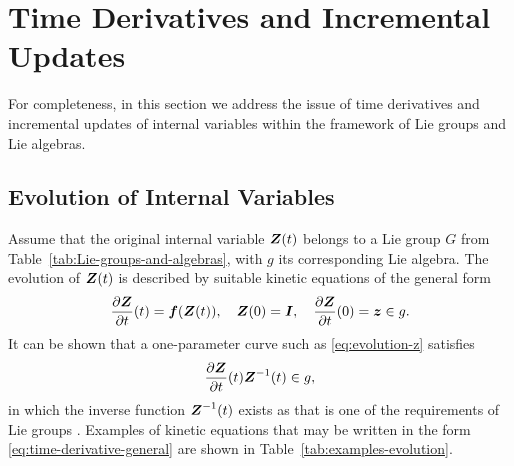 \documentclass[12pt]{article}
\begin{document}
\begin{table}[htbp]
\begin{center}
    \caption{Examples of interpolation and extrapolation with Lie algebras.
      $\bZ_1 = \bZ(-1)$ and $\bZ_2 = \bZ(1)$
      are given data and belong to the corresponding Lie group.
      $\bZ(\xi) := \exp[N_1(\xi)\log\bZ_1 + N_2(\xi)\log\bZ_2]$.
      $N_1(\xi):=\frac{1}{2}(1-\xi)$ and $N_2(\xi):=\frac{1}{2}(1+\xi)$.}
    \label{tab:examples-interpolation-Lie}
  \end{center}
\end{table}

\section{Time Derivatives and Incremental Updates}
\label{sec:derivatives}

For completeness, in this section we address the issue of time
derivatives and incremental updates of internal variables within the
framework of Lie groups and Lie algebras.

\subsection{Evolution of Internal Variables}

Assume that the original
internal variable ${\boldsymbol{Z}}(t)$ belongs to a Lie group $G$ from
Table~\ref{tab:Lie-groups-and-algebras}, with $g$ its corresponding Lie
algebra. The evolution of ${\boldsymbol{Z}}(t)$ is described by suitable kinetic
equations of the general form
\begin{equation} \label{eq:evolution-z}
  \frac{\partial {\boldsymbol{Z}}}{\partial t}(t) = {\boldsymbol{f}}({\boldsymbol{Z}}(t)), \quad
  {\boldsymbol{Z}}(0) = {\boldsymbol{I}}, \quad
  \frac{\partial {\boldsymbol{Z}}}{\partial t}(0) = {\boldsymbol{z}} \in g.
\end{equation}
It can be shown that a one-parameter curve such as
\eqref{eq:evolution-z} satisfies
\begin{equation} \label{eq:time-derivative-general}
  \frac{\partial {\boldsymbol{Z}}}{\partial t}(t) {\boldsymbol{Z}}^{-1}(t) \in g,
\end{equation}
in which the inverse function ${\boldsymbol{Z}}^{-1}(t)$ exists as that is one of
the requirements of Lie groups \citep{Procesi:2006, Sepanski:2007,
  Kosmann-Schwarzbach:2009, Gallier:2011}. Examples of kinetic
equations that may be written in the form
\eqref{eq:time-derivative-general} are shown in
Table~\ref{tab:examples-evolution}.
\end{document}
